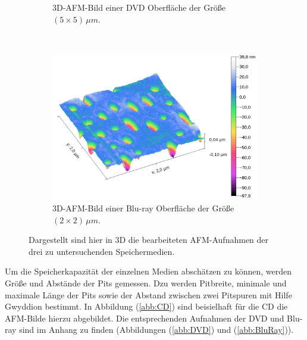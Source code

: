 \begin{figure}[H]
\begin{subfigure}[t]{0.45\textwidth}
	\caption{3D-AFM-Bild einer DVD Oberfl\"ache der Gr\"o{\ss}e $(5 \times 5) \, \mu m$.}
	\label{abb:dvd_3d}
	\end{subfigure}
	~
	\begin{subfigure}[t]{0.45\textwidth}
	\includegraphics[width=\textwidth]{AFM_auswertung/bluray_3d.png}
	\caption{3D-AFM-Bild einer Blu-ray Oberfl\"ache der Gr\"o{\ss}e $(2 \times 2) \, \mu m$.}
	\label{abb:br_3d}
	\end{subfigure}
\caption{Dargestellt sind hier in 3D die bearbeiteten AFM-Aufnahmen der drei zu untersuchenden Speichermedien.}
\label{abb:3d}
\end{figure}
Um die Speicherkapazit\"at der einzelnen Medien absch\"atzen zu k\"onnen, werden Gr\"o{\ss}e und Abst\"ande der Pits gemessen.
Dzu werden Pitbreite, minimale und maximale L\"ange der Pits sowie der Abstand zwischen zwei Pitspuren mit Hilfe Gwyddion bestimmt.
In Abbildung (\ref{abb:CD}) sind beisielhaft f\"ur die CD die AFM-Bilde hierzu abgebildet.
Die entsprechenden Aufnahmen der DVD und Blu-ray sind im Anhang zu finden (Abbildungen (\ref{abb:DVD}) und (\ref{abb:BluRay})).
